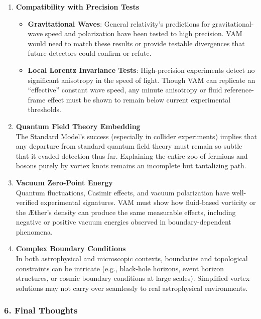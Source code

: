 \documentclass[aps,preprint,superscriptaddress]{revtex4-2}
\begin{document}
    \begin{enumerate}
        \item \textbf{Compatibility with Precision Tests}
        \begin{itemize}
            \item \textbf{Gravitational Waves}: General relativity’s predictions for gravitational-wave speed and polarization have been tested to high precision. VAM would need to match these results or provide testable divergences that future detectors could confirm or refute.
            \item \textbf{Local Lorentz Invariance Tests}: High-precision experiments detect no significant anisotropy in the speed of light. Though VAM can replicate an “effective” constant wave speed, any minute anisotropy or fluid reference-frame effect must be shown to remain below current experimental thresholds.
        \end{itemize}

        \item \textbf{Quantum Field Theory Embedding} \\
        The Standard Model’s success (especially in collider experiments) implies that any departure from standard quantum field theory must remain so subtle that it evaded detection thus far. Explaining the entire zoo of fermions and bosons purely by vortex knots remains an incomplete but tantalizing path.

        \item \textbf{Vacuum Zero-Point Energy} \\
        Quantum fluctuations, Casimir effects, and vacuum polarization have well-verified experimental signatures. VAM must show how fluid-based vorticity or the Æther’s density can produce the same measurable effects, including negative or positive vacuum energies observed in boundary-dependent phenomena.

        \item \textbf{Complex Boundary Conditions} \\
        In both astrophysical and microscopic contexts, boundaries and topological constraints can be intricate (e.g., black-hole horizons, event horizon structures, or cosmic boundary conditions at large scales). Simplified vortex solutions may not carry over seamlessly to real astrophysical environments.
    \end{enumerate}

    \subsubsection*{6. Final Thoughts}
\end{document}
